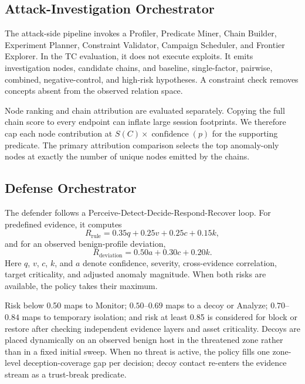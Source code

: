 \documentclass[runningheads]{llncs}
\begin{document}
\subsection{Attack-Investigation Orchestrator}

The attack-side pipeline invokes a Profiler, Predicate Miner, Chain Builder, Experiment Planner, Constraint Validator, Campaign Scheduler, and Frontier Explorer. In the TC evaluation, it does not execute exploits. It emits investigation nodes, candidate chains, and baseline, single-factor, pairwise, combined, negative-control, and high-risk hypotheses. A constraint check removes concepts absent from the observed relation space.

Node ranking and chain attribution are evaluated separately. Copying the full chain score to every endpoint can inflate large session footprints. We therefore cap each node contribution at $S(C)\times\operatorname{confidence}(p)$ for the supporting predicate. The primary attribution comparison selects the top anomaly-only nodes at exactly the number of unique nodes emitted by the chains.

\subsection{Defense Orchestrator}

The defender follows a Perceive-Detect-Decide-Respond-Recover loop. For predefined evidence, it computes
\begin{equation}
R_{\mathrm{rule}}=0.35q+0.25v+0.25c+0.15k,
\label{eq:rule-risk}
\end{equation}
and for an observed benign-profile deviation,
\begin{equation}
R_{\mathrm{deviation}}=0.50a+0.30c+0.20k.
\label{eq:deviation-risk}
\end{equation}
Here $q$, $v$, $c$, $k$, and $a$ denote confidence, severity, cross-evidence correlation, target criticality, and adjusted anomaly magnitude. When both risks are available, the policy takes their maximum.

Risk below 0.50 maps to Monitor; $0.50$--$0.69$ maps to a decoy or Analyze; $0.70$--$0.84$ maps to temporary isolation; and risk at least 0.85 is considered for block or restore after checking independent evidence layers and asset criticality. Decoys are placed dynamically on an observed benign host in the threatened zone rather than in a fixed initial sweep. When no threat is active, the policy fills one zone-level deception-coverage gap per decision; decoy contact re-enters the evidence stream as a trust-break predicate.
\end{document}
